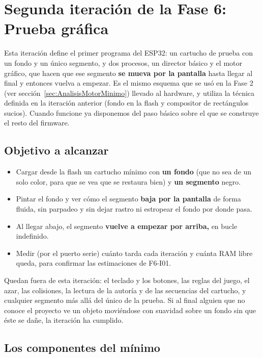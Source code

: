 \section{Segunda iteración de la Fase 6: Prueba gráfica}
\label{sec:F6I02}

Esta iteración define el primer programa del ESP32: un cartucho de prueba con un fondo y un único segmento, y dos procesos, un director básico y el motor gráfico, que hacen que ese segmento \textbf{se mueva por la pantalla} hasta llegar al final y entonces vuelva a empezar. Es el mismo esquema que se usó en la Fase 2 (ver sección~\ref{sec:AnalisisMotorMinimo}) llevado al hardware, y utiliza la técnica definida en la iteración anterior (fondo en la flash y compositor de rectángulos sucios). Cuando funcione ya disponemos del paso básico sobre el que se construye el resto del firmware.

\subsection{Objetivo a alcanzar}
\label{sec:F6I02Objetivo}

\begin{itemize}
	\item Cargar desde la flash un cartucho mínimo con \textbf{un fondo} (que no sea de un solo color, para que se vea que se restaura bien) y \textbf{un segmento} negro.
	\item Pintar el fondo y ver cómo el segmento \textbf{baja por la pantalla} de forma fluida, sin parpadeo y sin dejar rastro ni estropear el fondo por donde pasa.
	\item Al llegar abajo, el segmento \textbf{vuelve a empezar por arriba,} en bucle indefinido.
	\item Medir (por el puerto serie) cuánto tarda cada iteración y cuánta RAM libre queda, para confirmar las estimaciones de F6-I01.
\end{itemize}

Quedan fuera de esta iteración: el teclado y los botones, las reglas del juego, el azar, las colisiones, la lectura de la autoría y de las secuencias del cartucho, y cualquier segmento más allá del único de la prueba. Si al final alguien que no conoce el proyecto ve un objeto moviéndose con suavidad sobre un fondo sin que éste se dañe, la iteración ha cumplido.

\subsection{Los componentes del mínimo}
\label{sec:F6I02Componentes}

